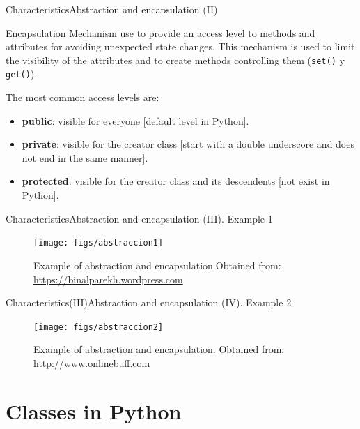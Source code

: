 \documentclass[10pt,compress]{beamer} %
\begin{document}
\begin{frame}{Characteristics}{Abstraction and encapsulation (II)}
	\begin{block}{Encapsulation}
		Mechanism use to provide an access level to methods and attributes for avoiding unexpected state changes. This mechanism is used to limit the visibility of the attributes and to create methods controlling them (\texttt{set()} y \texttt{get()}).
  	\end{block}	
	
The most common access levels are:
	
	\begin{itemize}
		\item \textbf{public}: visible for everyone  [default level in Python].
		\item \textbf{private}: visible for the creator class [start with a double underscore and does not end in the same manner].
		\item \textbf{protected}: visible for the creator class and its descendents \alert{[not exist in Python]}. 
	\end{itemize}
\end{frame}

\begin{frame}{Characteristics}{Abstraction and encapsulation (III). Example 1}
	\begin{figure}
		\texttt{[image: figs/abstraccion1]}
		\caption{{\scriptsize Example of abstraction and encapsulation.Obtained from: \url{https://binalparekh.wordpress.com}}}
	\end{figure}
\end{frame}

\begin{frame}{Characteristics(III)}{Abstraction and encapsulation (IV). Example 2}
	\begin{figure}
		\texttt{[image: figs/abstraccion2]}
		\caption{{\scriptsize Example of abstraction and encapsulation. Obtained from: \url{http://www.onlinebuff.com}}}
	\end{figure}
\end{frame}

\section{Classes in Python}
\end{document}
